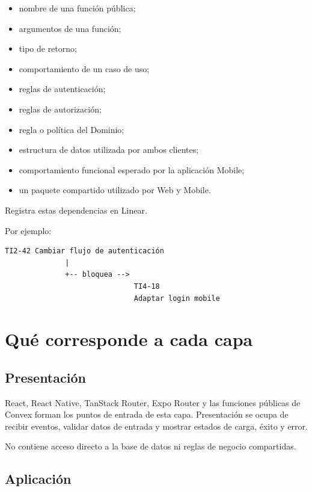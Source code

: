 \documentclass[11pt,a4paper]{article}
\begin{document}
\begin{itemize}
  \item nombre de una función pública;
  \item argumentos de una función;
  \item tipo de retorno;
  \item comportamiento de un caso de uso;
  \item reglas de autenticación;
  \item reglas de autorización;
  \item regla o política del Dominio;
  \item estructura de datos utilizada por ambos clientes;
  \item comportamiento funcional esperado por la aplicación Mobile;
  \item un paquete compartido utilizado por Web y Mobile.
\end{itemize}

Registra estas dependencias en Linear.

Por ejemplo:

\begin{lstlisting}
TI2-42 Cambiar flujo de autenticación
              |
              +-- bloquea -->
                              TI4-18
                              Adaptar login mobile
\end{lstlisting}

\section{Qué corresponde a cada capa}

\subsection*{Presentación}

React, React Native, TanStack Router, Expo Router y las funciones públicas de
Convex forman los puntos de entrada de esta capa. Presentación se ocupa de
recibir eventos, validar datos de entrada y mostrar estados de carga, éxito y
error.

No contiene acceso directo a la base de datos ni reglas de negocio compartidas.

\subsection*{Aplicación}
\end{document}
